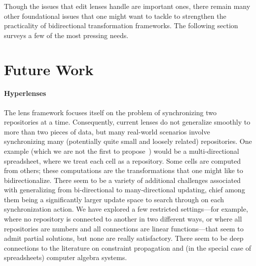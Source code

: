 Though the issues that edit lenses handle are important ones, there remain
many other foundational issues that one might want to tackle to strengthen
the practicality of bidirectional transformation frameworks. The following
section surveys a few of the most pressing needs.

\section{Future Work}
\label{sec:future}

\paragraph*{Hyperlenses}
The lens framework focuses itself on the problem of synchronizing two
repositories at a time. Consequently, current lenses do not generalize
smoothly to more than two pieces of data, but many real-world scenarios
involve synchronizing many (potentially quite small and loosely related)
repositories. One example (which we are not the first to
propose~\cite{macedotowards}) would be a multi-directional spreadsheet,
where we treat each cell as a repository. Some cells are computed from
others; these computations are the transformations that one might like to
bidirectionalize. There seem to be a variety of additional challenges
associated with generalizing from bi-directional to many-directional
updating, chief among them being a significantly larger update space to
search through on each synchronization action. We have explored a few
restricted settings---for example, where no repository is connected to
another in two different ways, or where all repositories are numbers and all
connections are linear functions---that seem to admit partial solutions, but
none are really satisfactory. There seem to be deep connections to the
literature on constraint propagation and (in the special case of
spreadsheets) computer algebra systems.


